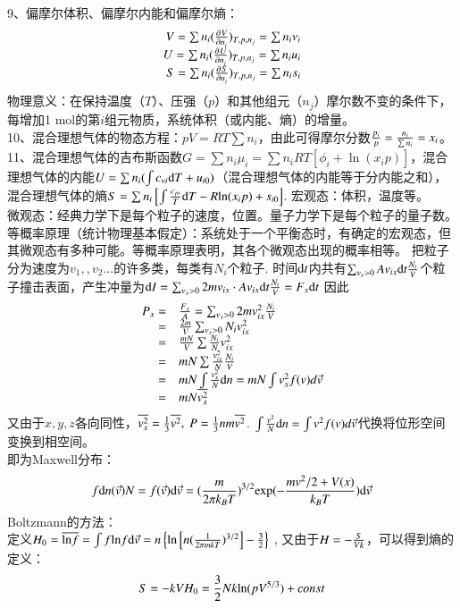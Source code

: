 \documentclass[UTF8,9pt]{ctexart}
\begin{document}
9、偏摩尔体积、偏摩尔内能和偏摩尔熵：
$$\begin{array}{rl} 
    V=\sum n_i(\frac{\partial^{} V}{\partial n_i^{}})_{T,p,n_j}=\sum n_i\nu_i\\
    U=\sum n_i(\frac{\partial^{} U}{\partial n_i^{}})_{T,p,n_j}=\sum n_iu_i\\
    S=\sum n_i(\frac{\partial^{} S}{\partial n_i^{}})_{T,p,n_j}=\sum n_is_i
 \end{array}$$
物理意义：在保持温度（$T$）、压强（$p$）和其他组元（$n_j$）摩尔数不变的条件下，每增加1 mol的第$i$组元物质，系统体积（或内能、熵）的增量。\\
10、混合理想气体的物态方程：$pV= RT\sum n_i$，由此可得摩尔分数$\frac{p_i}{p}=\frac{n_i}{\sum n_i}=x_i$。\\
11、混合理想气体的吉布斯函数$G=\sum n_i\mu_i=\sum n_iRT\left[\phi_i+\ln(x_ip)\right]$，混合理想气体的内能$U=\sum n_i(\int c_{\nu i}\mathrm{d} T+u_{i0})$（混合理想气体的内能等于分内能之和），混合理想气体的熵$S=\sum n_i\left[\int\frac{c_{pi}}{T}\mathrm{d} T-R\mathrm{ln}(x_ip)+s_{i0}\right]$. 
    宏观态：体积，温度等。\\
    微观态：经典力学下是每个粒子的速度，位置。量子力学下是每个粒子的量子数。\\
    等概率原理（统计物理基本假定）：系统处于一个平衡态时，有确定的宏观态，但其微观态有多种可能。等概率原理表明，其各个微观态出现的概率相等。
    把粒子分为速度为$v_1,,v_2...$的许多类，每类有$N_i$个粒子. 时间$\mathrm{d} t$内共有$\sum_{v_x>0} Av_{ix}\mathrm{d} t\frac{N_i}{V}$个粒子撞击表面，产生冲量为$\mathrm{d} I=\sum_{v_x>0} 2mv_{ix} \cdot Av_{ix}\mathrm{d} t\frac{N_i}{V}=F_x\mathrm{d} t$
    因此
    $$\begin{array}{rl} 
        P_x=&\frac{F_x}{A}=\sum_{v_x>0} 2mv_{ix}^2\frac{N_i}{V}\\
        =&\frac{2m}{V}\sum_{v_x>0} N_iv_{ix}^2\\
        =&\frac{mN}{V}\sum \frac{N_i}{N}v_{ix}^2\\
        =& mN\sum \frac{v_{ix}^2}{N}\frac{N_i}{V}\\
        =&mN\int \frac{v_x^2}{N}\mathrm{d} n=mN\int v_x^2f(v)d\vec{v}\\
        =&mN\overline{v_x^2}
     \end{array}$$
    又由于$x,y,z$各向同性，$\bar{v_x^2}=\ff{3}\bar{v^2},\ P=\ff{3}nm\bar{v^2}$.
    $\int \frac{v^2}{N}\mathrm{d} n=\int v^2f(v)d\vec{v}$代换将位形空间变换到相空间。\\
    即为Maxwell分布：
    $$f{\mathrm{d} n(\vec{v})}{N}=f(\vec{v})\mathrm{d} \vec v =(\frac{m}{2\pi k_BT})^{3/2}\mathrm{exp} (-\frac{mv^2/2+V(x)}{k_BT})\mathrm{d} \vec v$$
    Boltzmann的方法：\\
    定义$H_0=\overline{\mathrm{ln} f}=\int f\mathrm{ln} f\mathrm{d}\vec v= n\left\{\mathrm{ln}\left[n(\frac{1}{2\pi mkT})^{3/2}\right]-\frac{3}{2}\right\}$ , 又由于$H=-\frac{S}{Vk}$，可以得到熵的定义：
    $$S=-kVH_0=\frac{3}{2}Nk\mathrm{ln} (pV^{5/3})+const$$
\end{document}
